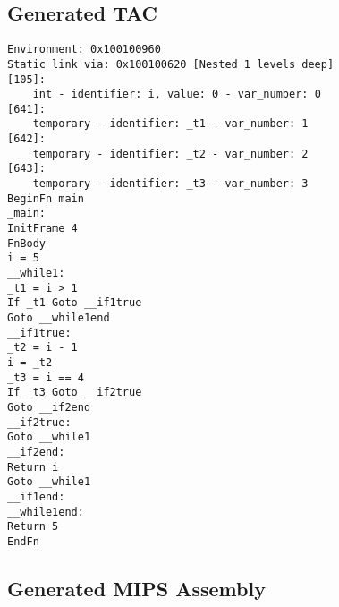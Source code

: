 \subsection{Generated TAC}
\begin{verbatim}
Environment: 0x100100960
Static link via: 0x100100620 [Nested 1 levels deep]
[105]:
	int - identifier: i, value: 0 - var_number: 0
[641]:
	temporary - identifier: _t1 - var_number: 1
[642]:
	temporary - identifier: _t2 - var_number: 2
[643]:
	temporary - identifier: _t3 - var_number: 3
BeginFn main
_main:
InitFrame 4
FnBody
i = 5
__while1:
_t1 = i > 1
If _t1 Goto __if1true
Goto __while1end
__if1true:
_t2 = i - 1
i = _t2
_t3 = i == 4
If _t3 Goto __if2true
Goto __if2end
__if2true:
Goto __while1
__if2end:
Return i
Goto __while1
__if1end:
__while1end:
Return 5
EndFn
\end{verbatim}\subsection{Generated MIPS Assembly}
